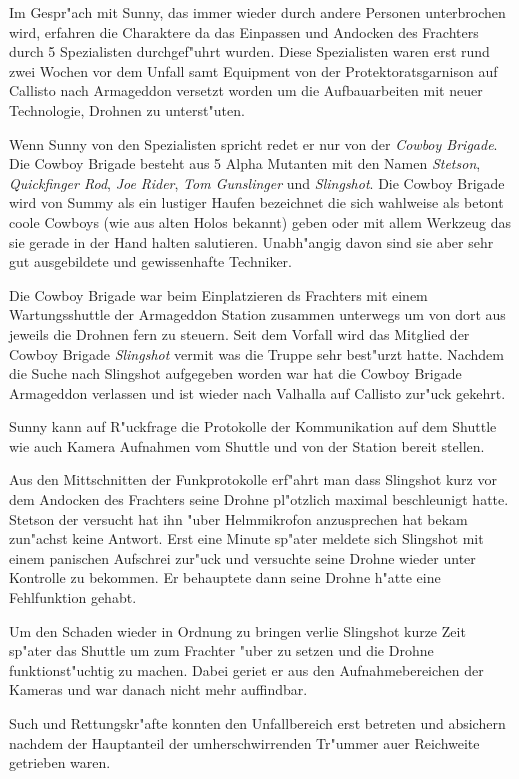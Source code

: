 Im Gespr"ach mit Sunny, das immer wieder durch andere Personen unterbrochen wird, erfahren die Charaktere da\3 das Einpassen und Andocken des Frachters durch 5 Spezialisten durchgef"uhrt wurden. Diese Spezialisten waren erst rund zwei Wochen vor dem Unfall samt Equipment von  der Protektoratsgarnison auf Callisto nach Armageddon versetzt worden um die Aufbauarbeiten mit neuer Technologie, Drohnen zu unterst"uten.

Wenn Sunny von den Spezialisten spricht redet er nur von der \emph{Cowboy Brigade}. Die Cowboy Brigade besteht aus 5 Alpha Mutanten mit den Namen \emph{Stetson}, \emph{Quickfinger Rod}, \emph{Joe Rider}, \emph{Tom Gunslinger} und \emph{Slingshot}. Die Cowboy Brigade wird von Summy als ein lustiger Haufen bezeichnet die sich wahlweise als betont coole Cowboys (wie aus alten Holos bekannt) geben oder mit allem Werkzeug das sie gerade in der Hand halten salutieren. Unabh"angig davon sind sie aber sehr gut ausgebildete und gewissenhafte Techniker.

Die Cowboy Brigade war beim Einplatzieren ds Frachters mit einem Wartungsshuttle der Armageddon Station zusammen unterwegs um von dort aus jeweils die Drohnen fern zu steuern. Seit dem Vorfall wird das Mitglied der Cowboy Brigade \emph{Slingshot} vermi\3t was die Truppe sehr best"urzt hatte. Nachdem die Suche nach Slingshot aufgegeben worden war hat die Cowboy Brigade Armageddon verlassen und ist wieder nach Valhalla auf Callisto zur"uck gekehrt.

Sunny kann auf R"uckfrage die Protokolle der Kommunikation auf dem Shuttle wie auch Kamera Aufnahmen vom Shuttle und von der Station bereit stellen.

Aus den Mittschnitten der Funkprotokolle erf"ahrt man dass Slingshot kurz vor dem Andocken des Frachters seine Drohne pl"otzlich maximal beschleunigt hatte. Stetson der versucht hat ihn "uber Helmmikrofon anzusprechen hat bekam zun"achst keine Antwort. Erst eine Minute sp"ater meldete sich Slingshot mit einem panischen Aufschrei zur"uck und versuchte seine Drohne wieder unter Kontrolle zu bekommen. Er behauptete dann seine Drohne h"atte eine Fehlfunktion gehabt.

Um den Schaden wieder in Ordnung zu bringen verlie\3 Slingshot kurze Zeit sp"ater das Shuttle um zum Frachter "uber zu setzen und die Drohne funktionst"uchtig zu machen. Dabei geriet er aus den Aufnahmebereichen der Kameras und war danach nicht mehr auffindbar.

Such und Rettungskr"afte konnten den Unfallbereich erst betreten und absichern nachdem der Hauptanteil der umherschwirrenden Tr"ummer au\3er Reichweite getrieben waren.



